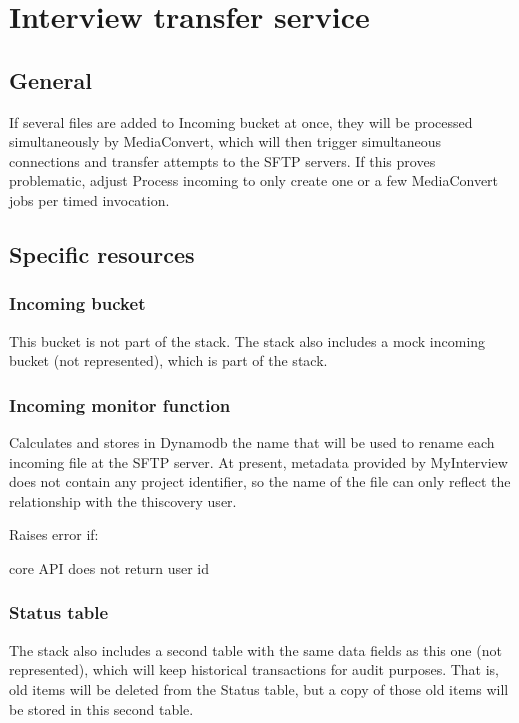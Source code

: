 \documentclass{article}
\begin{document}
\thispagestyle{empty}

\section{Interview transfer service}

\subsection{General}
If several files are added to Incoming bucket at once, they will be processed simultaneously by MediaConvert, which will then trigger simultaneous connections and transfer attempts to the SFTP servers. If this proves problematic, adjust Process incoming to only create one or a few MediaConvert jobs per timed invocation.

\subsection{Specific resources}
\subsubsection{Incoming bucket}
This bucket is not part of the stack. The stack also includes a mock incoming bucket (not represented), which is part of the stack.
\subsubsection{Incoming monitor function}
Calculates and stores in Dynamodb the name that will be used to rename each incoming file at the SFTP server. At present, metadata provided by MyInterview does not contain any project identifier, so the name of the file can only reflect the relationship with the thiscovery user.

Raises error if:
\begin{compactenum}
\item core API does not return user id
\end{compactenum}


\subsubsection*{Status table}
The stack also includes a second table with the same data fields as this one (not represented), which will keep historical transactions for audit purposes. That is, old items will be deleted from the Status table, but a copy of those old items will be stored in this second table.
\end{document}
